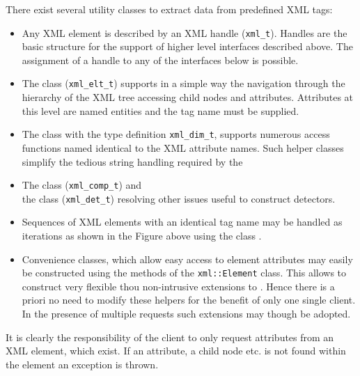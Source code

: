 \documentclass[10pt,a4paper]{article}
\begin{document}
\noindent
There exist several utility classes to extract data from predefined XML tags:
\begin{itemize}\itemcompact
\item Any XML element is described by an XML handle
       ({\tt{xml\_t}}). Handles are the basic structure for the support
       of higher level interfaces described above. The assignment of a handle
       to any of the interfaces below is possible.
\item The class  
       ({\tt{xml\_elt\_t}})
       supports in a simple way the navigation through the hierarchy of the 
       XML tree accessing child nodes and attributes. Attributes at this
       level are named entities and the tag name must be supplied.
\item The class  
       with the type definition {\tt{xml\_dim\_t}}, 
       supports numerous access functions named identical to the
       XML attribute names. Such helper classes simplify the tedious
       string handling required by the 
\item The class  
       ({\tt{xml\_comp\_t}}) and \\
       the class 
       ({\tt{xml\_det\_t}}) resolving other issues useful to construct detectors.
\item Sequences of XML elements with an identical tag name may be handled
       as iterations as shown in the Figure above using the class
       .
\item Convenience classes, which allow easy access to element attributes 
       may easily be constructed using the methods of the {\tt{xml::Element}}
       class. This allows to construct very flexible thou non-intrusive 
       extensions to \DDhep. Hence there is a priori no need to modify
       these helpers for the benefit of only one single client.
       In the presence of multiple requests such extensions may though be adopted.
\end{itemize}
It is clearly the responsibility of the client to only request attributes
from an XML element, which exist. If an attribute, a child node etc. is not 
found within the element an exception is thrown.
\end{document}
